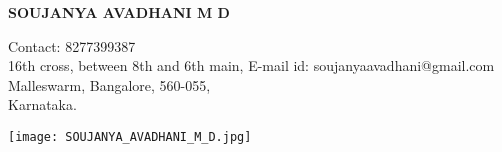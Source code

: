 \documentclass[letterpaper,11pt,oneside]{article}
\begin{document}
	\begin{center}
		\textbf{{\huge SOUJANYA AVADHANI M D}}\\
	\end{center}
	\vspace{-2ex}
	\noindent\hrulefill
	\vspace{5ex}
	
	 \hfill \large {Contact: 8277399387}
	\\
	\large {16th cross, between 8th and 6th main,} \hfill \large {E-mail id: soujanyaavadhani@gmail.com}
	\\
	\large {Malleswarm, Bangalore, 560-055,}
	\\
	\large {Karnataka.}
    
    \hfill \texttt{[image: SOUJANYA\_AVADHANI\_M\_D.jpg]}\\	
\end{document}
